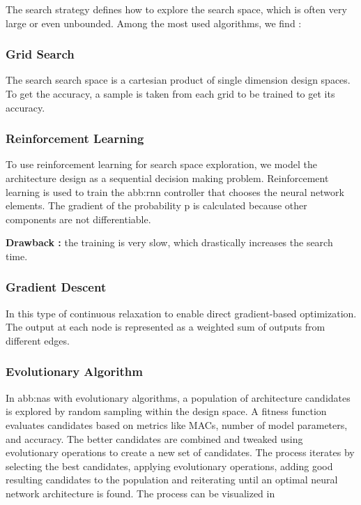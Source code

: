         The search strategy defines how to explore the search space, which is often very large or even unbounded. Among the most used algorithms, we find :

        \subsubsection{Grid Search}
            The search search space is a cartesian product of single dimension design spaces. To get the accuracy, a sample is taken from each grid to be trained to get its accuracy.
            


        \subsubsection{Reinforcement Learning}
            To use reinforcement learning  for search space exploration, we model the architecture design as a sequential decision making problem. Reinforcement learning is used to train the \gls{abb:rnn} controller that chooses the neural network elements. The gradient of the probability p is calculated because other components are not differentiable.~\cite{nasrl}

            \textbf{Drawback :} the training is very slow, which drastically increases the search time.

        \subsubsection{Gradient Descent}
            In this type of continuous relaxation to enable direct gradient-based optimization. The output at each node is represented as a weighted sum of outputs from different edges.~\cite{darts}

        \subsubsection{Evolutionary Algorithm}
            In \gls{abb:nas} with evolutionary algorithms, a population of architecture candidates is explored by random sampling within the design space. A fitness function evaluates candidates based on metrics like MACs, number of model parameters, and accuracy. The better candidates are combined and tweaked using evolutionary operations to create a new set of candidates. The process iterates by selecting the best candidates, applying evolutionary operations, adding good resulting candidates to the population and reiterating until an optimal neural network architecture is found. The process can be visualized in~

